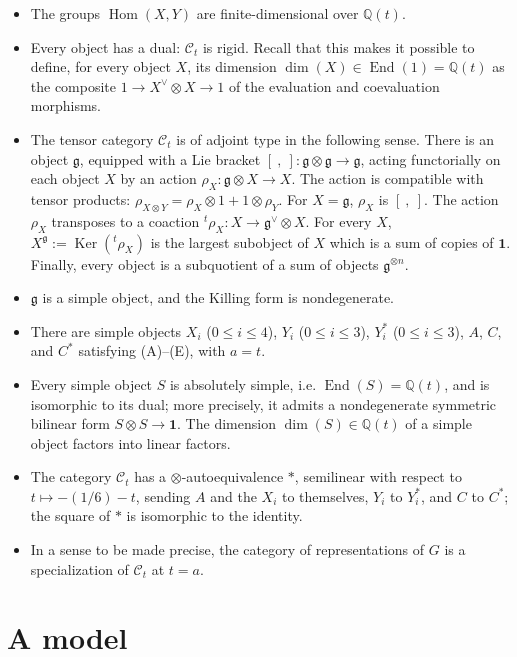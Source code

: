 \documentclass[11pt,a4paper]{article}
\DeclareMathOperator{\Hom}{Hom}
\DeclareMathOperator{\Ker}{Ker}
\DeclareMathOperator{\End}{End}
\newcommand{\frg}{\mathfrak{g}}
\newcommand{\Q}{\mathbb{Q}}
\begin{document}
\begin{itemize}[leftmargin=2em]
\item[(i)] The groups $\Hom(X,Y)$ are finite-dimensional over $\Q(t)$.
\item[(ii)] Every object has a dual: $\mathcal C_t$ is rigid. Recall that this makes it possible to define, for every object $X$, its dimension $\dim(X)\in \End(1)=\Q(t)$ as the composite $1\to X^\vee\otimes X\to 1$ of the evaluation and coevaluation morphisms.
\item[(iii)] The tensor category $\mathcal C_t$ is of adjoint type in the following sense. There is an object $\frg$, equipped with a Lie bracket $[\ ,\ ]:\frg\otimes\frg\to\frg$, acting functorially on each object $X$ by an action $\rho_X:\frg\otimes X\to X$. The action is compatible with tensor products: $\rho_{X\otimes Y}=\rho_X\otimes 1+1\otimes\rho_Y$. For $X=\frg$, $\rho_X$ is $[\ ,\ ]$. The action $\rho_X$ transposes to a coaction ${}^t\!\rho_X:X\to\frg^\vee\otimes X$. For every $X$, $X^\frg:=\Ker({}^t\!\rho_X)$ is the largest subobject of $X$ which is a sum of copies of $\mathbf 1$. Finally, every object is a subquotient of a sum of objects $\frg^{\otimes n}$.
\item[(iv)] $\frg$ is a simple object, and the Killing form is nondegenerate.
\item[(v)] There are simple objects $X_i$ ($0\leq i\leq 4$), $Y_i$ ($0\leq i\leq 3$), $Y_i^*$ ($0\leq i\leq 3$), $A$, $C$, and $C^*$ satisfying (A)--(E), with $a=t$.
\item[(vi)] Every simple object $S$ is absolutely simple, i.e. $\End(S)=\Q(t)$, and is isomorphic to its dual; more precisely, it admits a nondegenerate symmetric bilinear form $S\otimes S\to\mathbf 1$. The dimension $\dim(S)\in\Q(t)$ of a simple object factors into linear factors.
\item[(vii)] The category $\mathcal C_t$ has a $\otimes$-autoequivalence $*$, semilinear with respect to $t\mapsto -(1/6)-t$, sending $A$ and the $X_i$ to themselves, $Y_i$ to $Y_i^*$, and $C$ to $C^*$; the square of $*$ is isomorphic to the identity.
\item[(viii)] In a sense to be made precise, the category of representations of $G$ is a specialization of $\mathcal C_t$ at $t=a$.
\end{itemize}

\section*{A model}
\end{document}
